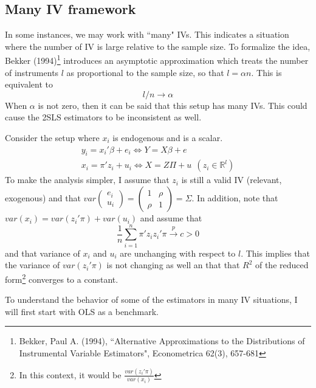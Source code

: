 \documentclass[12pt]{article}
\theoremstyle{definition}
\theoremstyle{property}
\theoremstyle{assumption}
\theoremstyle{example}
\theoremstyle{comment}
\begin{document}
\subsection{Many IV framework}
In some instances, we may work with ``many" IVs. This indicates a situation where the number of IV is large relative to the sample size. To formalize the idea, Bekker (1994)\footnote{Bekker, Paul A. (1994),  ``Alternative Approximations to the Distributions of Instrumental Variable Estimators", Econometrica 62(3), 657-681} introduces an asymptotic approximation which treats the number of instruments $l$ as proportional to the sample size, so that $l=\alpha n$. This is equivalent to 
\[
l/n \to \alpha 
\]
When $\alpha$ is not zero, then it can be said that this setup has many IVs. This could cause the 2SLS estimators to be inconsistent as well. \par
Consider the setup where $x_i$ is endogenous and is a scalar. 
\begin{gather*}
y_ i = x_i'\beta+e_i \iff Y=X\beta+e \\
x_i = \pi'z_i+u_i \iff X=Z\Pi+u \ \ (z_i \in \mathbb{R}^l)
\end{gather*}
To make the analysis simpler, I assume that $z_i$ is still a valid IV (relevant, exogenous) and that $var\begin{pmatrix} e_i \\ u_i \end{pmatrix} = \begin{pmatrix}1 & \rho \\ \rho & 1 \end{pmatrix} = \Sigma$. In addition, note that $var(x_i) = var(z_i'\pi)+var(u_i)$ and assume that
\[
\frac{1}{n}\sum_{i=1}^n \pi'z_iz_i'\pi\xrightarrow{p}c>0
\]
and that variance of $x_i$ and $u_i$ are unchanging with respect to $l$. This implies that the variance of $var(z_i'\pi)$ is not changing as well an that that $R^2$ of the reduced form\footnote{In this context, it would be $\frac{var(z_i'\pi)}{var(x_i)}$}  converges to a constant. \par
To understand the behavior of some of the estimators in many IV situations, I will first start with OLS as a benchmark.
\end{document}
